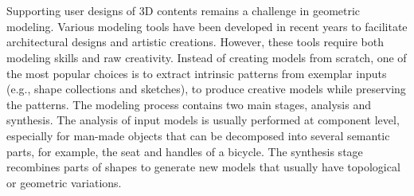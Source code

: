 

\chapter*{}




Supporting user designs of 3D contents remains a challenge in geometric modeling. Various modeling tools have been developed in recent years to facilitate architectural designs and artistic creations. However, these tools require both modeling skills and raw creativity. Instead of creating models from scratch, one of the most popular choices is to extract intrinsic patterns from exemplar inputs (e.g., shape collections and sketches), to produce creative models while preserving the patterns. The modeling process contains two main stages, analysis and synthesis. The analysis of input models is usually performed at component level, especially for man-made objects that can be decomposed into several semantic parts, for example, the seat and handles of a bicycle. The synthesis stage recombines parts of shapes to generate new models that usually have topological or geometric variations.

